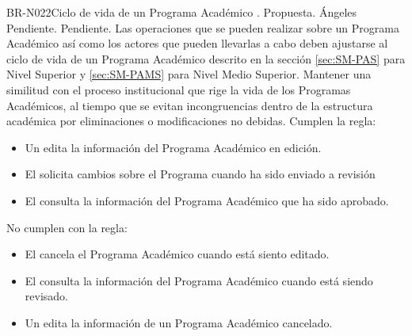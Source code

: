 \begin{BusinessRule}{BR-N022}{Ciclo de vida de un Programa Académico}
	{\bcAutorization}    %
	{\btEnabler}     %
	{\blControlling}    %
	.
	\BRItem[Estado] Propuesta.
	 Ángeles
	 Pendiente.
	 Pendiente.
	\BRItem[Descripción] Las operaciones que se pueden realizar sobre un Programa Académico así como los actores que pueden llevarlas a cabo deben ajustarse al ciclo de vida de un Programa Académico descrito en la sección \ref{sec:SM-PAS} para Nivel Superior y \ref{sec:SM-PAMS} para Nivel Medio Superior.
	\BRItem[Motivación] Mantener una similitud con el proceso institucional que rige la vida de los Programas Académicos, al tiempo que se evitan incongruencias dentro de la estructura académica por eliminaciones o modificaciones no debidas.
	 Cumplen la regla:
		\begin{itemize}
			\item Un  edita la información del Programa Académico en edición.
			\item El  solicita cambios sobre el Programa cuando ha sido enviado a revisión
			\item El  consulta la información del Programa Académico que ha sido aprobado.
		\end{itemize}
	 No cumplen con la regla:
		\begin{itemize}
			\item El  cancela el Programa Académico cuando está siento editado.
			\item El  consulta la información del Programa Académico cuando está siendo revisado.
			\item Un  edita la información de un Programa Académico cancelado.
		\end{itemize}
	
\end{BusinessRule}

